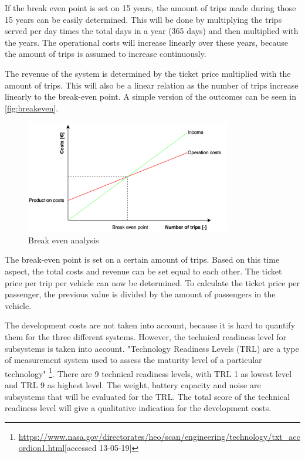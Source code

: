 If the break even point is set on 15 years, the amount of trips made during those 15 years can be easily determined. This will be done by multiplying the trips served per day times the total days in a year (365 days) and then multiplied with the years. The operational costs will increase linearly over these years, because the amount of trips is assumed to increase continuously.

The revenue of the system is determined by the ticket price multiplied with the amount of trips. This will also be a linear relation as the number of trips increase linearly to the break-even point. A simple version of the outcomes can be seen in \autoref{fig:breakeven}.

\begin{figure}[H]
    \centering
    \captionsetup{justification=centering}
    \includegraphics[width=0.8\textwidth]{Figures/Ticketprice.png}
    \captionsetup{justification=centering}
    \caption{Break even analysis}
    \label{fig:breakeven}
\end{figure}

The break-even point is set on a certain amount of trips. Based on this time aspect, the total costs and revenue can be set equal to each other. The ticket price per trip per vehicle can now be determined. To calculate the ticket price per passenger, the previous value is divided by the amount of passengers in the vehicle.

The development costs are not taken into account, because it is hard to quantify them for the three different systems. However, the technical readiness level for subsystems is taken into account. "Technology Readiness Levels (TRL) are a type of measurement system used to assess the maturity level of a particular technology" \footnote{\url{https://www.nasa.gov/directorates/heo/scan/engineering/technology/txt_accordion1.html}[accessed 13-05-19]}. There are 9 technical readiness levels, with TRL 1 as lowest level and TRL 9 as highest level. The weight, battery capacity and noise are subsystems that will be evaluated for the TRL. The total score of the technical readiness level will give a qualitative indication for the development costs. 

